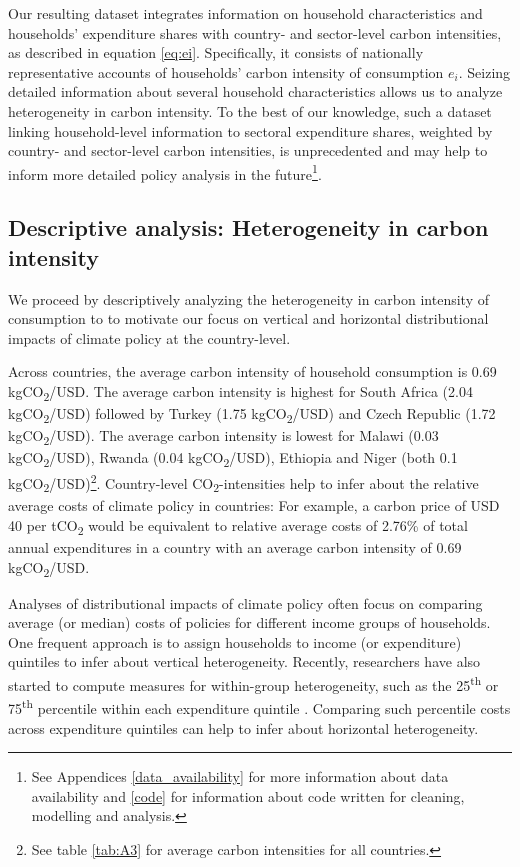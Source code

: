 \documentclass[12pt, a4paper]{article}
\begin{document}
Our resulting dataset integrates information on household characteristics and households' expenditure shares with country- and sector-level carbon intensities, as described in equation \ref{eq:ei}. Specifically, it consists of nationally representative accounts of households' carbon intensity of consumption $e_{i}$. Seizing detailed information about several household characteristics allows us to analyze heterogeneity in carbon intensity. To the best of our knowledge, such a dataset linking household-level information to sectoral expenditure shares, weighted by country- and sector-level carbon intensities, is unprecedented and may help to inform more detailed policy analysis in the future\footnote{See Appendices \ref{data_availability} for more information about data availability and \ref{code} for information about code written for cleaning, modelling and analysis.}.

\subsection{Descriptive analysis: Heterogeneity in carbon intensity} \label{sec:descriptive}

We proceed by descriptively analyzing the heterogeneity in carbon intensity of consumption to to motivate our focus on vertical and horizontal distributional impacts of climate policy at the country-level.

Across countries, the average carbon intensity of household consumption is 0.69 kgCO\textsubscript{2}/USD. The average carbon intensity is highest for South Africa (2.04 kgCO\textsubscript{2}/USD) followed by Turkey (1.75 kgCO\textsubscript{2}/USD) and Czech Republic (1.72 kgCO\textsubscript{2}/USD). The average carbon intensity is lowest for Malawi (0.03 kgCO\textsubscript{2}/USD), Rwanda (0.04 kgCO\textsubscript{2}/USD), Ethiopia and Niger (both 0.1 kgCO\textsubscript{2}/USD)\footnote{See table \ref{tab:A3} for average carbon intensities for all countries.}. Country-level CO\textsubscript{2}-intensities help to infer about the relative average costs of climate policy in countries: For example, a carbon price of USD 40 per tCO\textsubscript{2} \autocite{Stiglitz.2017} would be equivalent to relative average costs of 2.76\% of total annual expenditures in a country with an average carbon intensity of 0.69 kgCO\textsubscript{2}/USD.

Analyses of distributional impacts of climate policy often focus on comparing average (or median) costs of policies for different income groups of households. One frequent approach is to assign households to income (or expenditure) quintiles to infer about vertical heterogeneity. Recently, researchers have also started to compute measures for within-group heterogeneity, such as the 25\textsuperscript{th} or 75\textsuperscript{th} percentile within each expenditure quintile \autocite{Cronin.2019, Missbach.2024}. Comparing such percentile costs across expenditure quintiles can help to infer about horizontal heterogeneity.
\end{document}
